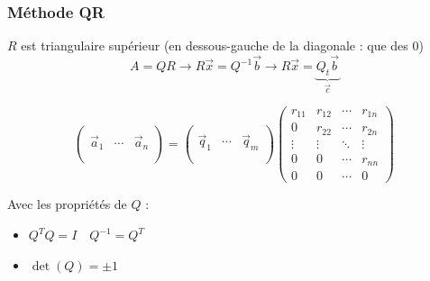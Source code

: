 \documentclass[resume]{subfiles}
\begin{document}
\subsubsection{Méthode QR}
$R$ est triangulaire supérieur (en dessous-gauche de la diagonale : que des 0)
$$A=QR\longrightarrow R\vec{x}=Q^{-1}\vec{b}\longrightarrow R\vec{x}=\underbrace{Q_t\vec{b}}_{\vec{c}}$$
\begin{scriptsize}
$$\begin{pmatrix}
\\
\vec{a}_1 & \cdots & \vec{a}_n\\
\\
\end{pmatrix}=\begin{pmatrix}\\
\vec{q}_1 & \cdots & \vec{q}_m\\
\\
\end{pmatrix}\begin{pmatrix}
r_{11} & r_{12} & \cdots & r_{1n}\\
0 & r_{22} & \cdots & r_{2n}\\
\vdots & \vdots & \ddots & \vdots\\
0 & 0 & \cdots & r_{nn}\\
0 & 0 & \cdots & 0
\end{pmatrix}$$
\end{scriptsize}
Avec les propriétés de $Q$ :
\begin{itemize}
\item $Q^TQ=I\quad Q^{-1}=Q^T$
\item $\det(Q)=\pm 1$
\end{itemize}
\end{document}
